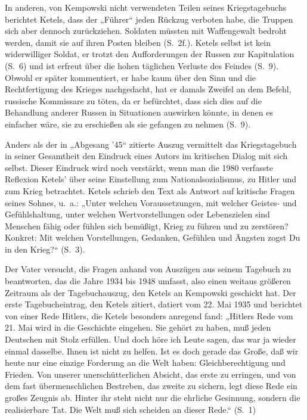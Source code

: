 \begin{multicols*}{2}
In anderen, von Kempowski nicht verwendeten Teilen seines Kriegstagebuchs berichtet Ketels, dass der „Führer“ jeden Rückzug verboten habe, die Truppen sich aber dennoch zurückziehen. Soldaten müssten mit Waffengewalt bedroht werden, damit sie auf ihren Posten bleiben (S. 2f.). Ketels selbst ist kein widerwilliger Soldat, er trotzt den Aufforderungen der Russen zur Kapitulation (S. 6) und ist erfreut über die hohen täglichen Verluste des Feindes (S. 9). Obwohl er später kommentiert, er habe kaum über den Sinn und die Rechtfertigung des Krieges nachgedacht, hat er damals Zweifel an dem Befehl, russische Kommissare zu töten, da er befürchtet, dass sich dies auf die Behandlung anderer Russen in Situationen auswirken könnte, in denen es einfacher wäre, sie zu erschießen als sie gefangen zu nehmen (S. 9).

Anders als der in „Abgesang ’45“ zitierte Auszug vermittelt das Kriegstagebuch in seiner Gesamtheit den Eindruck eines Autors im kritischen Dialog mit sich selbst. Dieser Eindruck wird noch verstärkt, wenn man die 1980 verfasste Reflexion Ketels’ über seine Einstellung zum Nationalsozialismus, zu Hitler und zum Krieg betrachtet. Ketels schrieb den Text als Antwort auf kritische Fragen seines Sohnes, u. a.: „Unter welchen Voraussetzungen, mit welcher Geistes- und Gefühlshaltung, unter welchen Wertvorstellungen oder Lebenszielen sind Menschen fähig oder fühlen sich bemüßigt, Krieg zu führen und zu zerstören? Konkret: Mit welchen Vorstellungen, Gedanken, Gefühlen und Ängsten zogst Du in den Krieg?“ (S. 3).

Der Vater versucht, die Fragen anhand von Auszügen aus seinem Tagebuch zu beantworten, das die Jahre 1934 bis 1948 umfasst, also einen weitaus größeren Zeitraum als der Tagebuchauszug, den Ketels an Kempowski geschickt hat. Der erste Tagebucheintrag, den Ketels zitiert, datiert vom 22. Mai 1935 und berichtet von einer Rede Hitlers, die Ketels besonders anregend fand: „Hitlers Rede vom 21. Mai wird in die Geschichte eingehen. Sie gehört zu haben, muß jeden Deutschen mit Stolz erfüllen. Und doch höre ich Leute sagen, das war ja wieder einmal dasselbe. Ihnen ist nicht zu helfen. Ist es doch gerade das Große, daß wir heute nur eine einzige Forderung an die Welt haben: Gleichberechtigung und Frieden. Von unserer unerschütterlichen Absicht, das erste zu erringen, und von dem fast übermenschlichen Bestreben, das zweite zu sichern, legt diese Rede ein großes Zeugnis ab. Hinter ihr steht nicht nur die ehrliche Gesinnung, sondern die realisierbare Tat. Die Welt muß sich scheiden an dieser Rede.“ (S. 1)


\end{multicols*}
